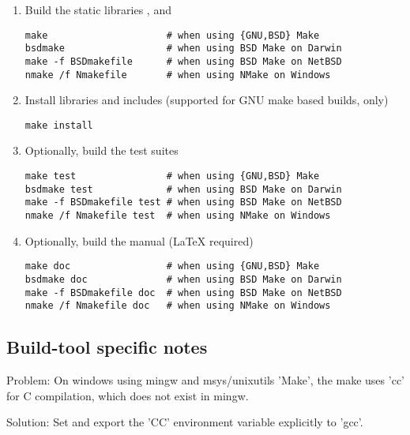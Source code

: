 \begin{enumerate}
\item Build the static libraries ,  and 
\begin{lstlisting}
make                     # when using {GNU,BSD} Make
bsdmake                  # when using BSD Make on Darwin
make -f BSDmakefile      # when using BSD Make on NetBSD
nmake /f Nmakefile       # when using NMake on Windows
\end{lstlisting}
\item Install libraries and includes (supported for GNU make based builds, only)
\begin{lstlisting}
make install 
\end{lstlisting}
\item Optionally, build the test suites
\begin{lstlisting}
make test                # when using {GNU,BSD} Make
bsdmake test             # when using BSD Make on Darwin
make -f BSDmakefile test # when using BSD Make on NetBSD
nmake /f Nmakefile test  # when using NMake on Windows
\end{lstlisting}
\item Optionally, build the manual (LaTeX required)
\begin{lstlisting}
make doc                 # when using {GNU,BSD} Make
bsdmake doc              # when using BSD Make on Darwin
make -f BSDmakefile doc  # when using BSD Make on NetBSD
nmake /f Nmakefile doc   # when using NMake on Windows
\end{lstlisting}
\end{enumerate}

\subsection{Build-tool specific notes}

Problem: On windows using mingw and msys/unixutils 'Make', the make uses
'cc' for C compilation, which does not exist in mingw.

Solution: Set and export the 'CC' environment variable explicitly to 'gcc'. 

